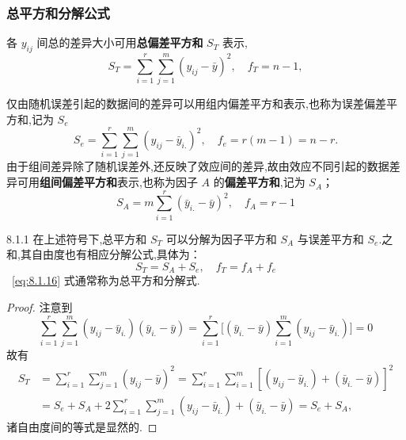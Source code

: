 \subsubsection{总平方和分解公式}

各 $y_{ij}$ 间总的差异大小可用\textbf{总偏差平方和} $S_T$ 表示,
\begin{equation}\label{eq:8.1.13}
  S_{T}=\sum_{i=1}^{r} \sum_{j=1}^{m}\left(y_{i j}-\bar{y}\right)^{2}, \quad f_{T} = n-1,
\end{equation}

仅由随机误差引起的数据间的差异可以用组内偏差平方和表示,也称为误差偏差平方和,记为 $S_e$
\begin{equation}\label{eq:8.1.14}
  S_{e}=\sum_{i=1}^{r} \sum_{j=1}^{m}\left(y_{i j}-\bar{y}_{i .}\right)^{2}, \quad f_{e}=r(m-1)=n-r.
\end{equation}
由于组间差异除了随机误差外,还反映了效应间的差异,故由效应不同引起的数据差异可用\textbf{组间偏差平方和}表示,也称为因子 $A$ 的\textbf{偏差平方和},记为 $S_A$；
\begin{equation}\label{eq:8.1.15}
  S_{A}=m \sum_{i=1}^{r}\left(\bar{y}_{i.}-\bar{y}\right)^{2}, \quad f_{A}=r-1
\end{equation}

\begin{theorem}{}{8.1.1}
在上述符号下,总平方和 $S_T$ 可以分解为因子平方和 $S_A$ 与误差平方和 $S_e$.之和,其自由度也有相应分解公式,具体为：
\begin{equation} \label{eq:8.1.16}
S_{T}=S_{A}+ S_{e}, \quad f_{T}=f_{A}+f_{e}
\end{equation}
~\eqref{eq:8.1.16} 式通常称为总平方和分解式. 
\end{theorem}

\begin{proof}
注意到
  \begin{equation*}
    \sum_{i=1}^{r} \sum_{j=1}^{m}(y_{i j}-\bar{y}_{i.})(\bar{y}_{i.}-\bar{y})= \sum_{i=1}^{r}\big[(\bar{y}_{i.}-\bar{y}) \sum_{i=1}^{m}(y_{i j}-\bar{y}_{i.})\big]=0
    \end{equation*}
故有
    \begin{align*}
      S_{T} & =\sum_{i=1}^{r} \sum_{j=1}^{m}(y_{i j}-\bar{y})^{2} = \sum_{i=1}^{r} \sum_{i=1}^{m}[(y_{i j}-\bar{y}_{i.})+(\bar{y}_{i.}-\bar{y})]^{2}\\
      &=S_{e}+S_{A} + 2 \sum_{i=1}^{r} \sum_{j=1}^{m}(y_{i j}-\bar{y}_{i.})+(\bar{y}_{i .}-\bar{y}) = S_{e} + S_{A},
    \end{align*}
诸自由度间的等式是显然的.
\end{proof}

